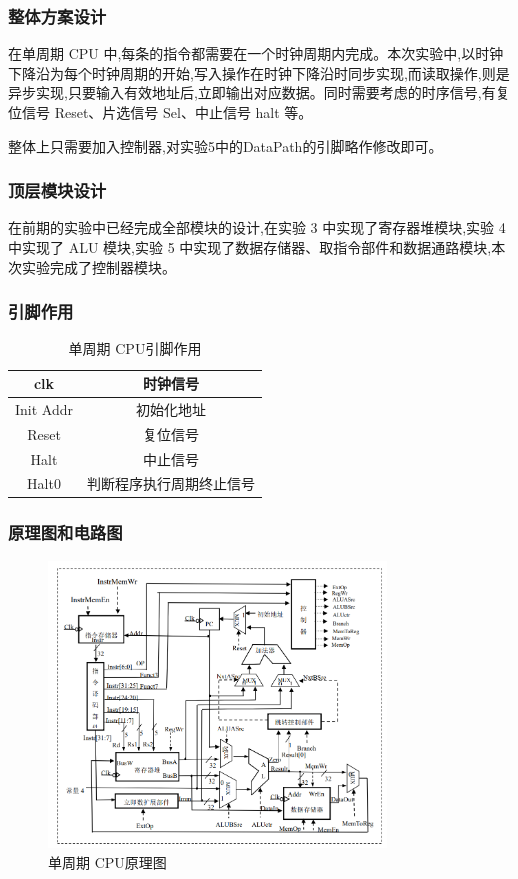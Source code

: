 \documentclass{article}
\begin{document}
    \subsubsection{整体方案设计}
    在单周期 CPU 中,每条的指令都需要在一个时钟周期内完成。本次实验中,以时钟下降沿为每个时钟周期的开始,写入操作在时钟下降沿时同步实现,而读取操作,则是异步实现,只要输入有效地址后,立即输出对应数据。同时需要考虑的时序信号,有复位信号 Reset、片选信号 Sel、中止信号 halt 等。\par
    整体上只需要加入控制器,对实验5中的DataPath的引脚略作修改即可。

    \subsubsection{顶层模块设计}
    在前期的实验中已经完成全部模块的设计,在实验 3 中实现了寄存器堆模块,实验 4 中实现了 ALU 模块,实验 5 中实现了数据存储器、取指令部件和数据通路模块,本次实验完成了控制器模块。

    \subsubsection{引脚作用}
    \begin{table}[H]
    \centering
    \begin{tabular}{|c|c|}
        \hline
        clk   & 时钟信号 \\ \hline
        Init Addr & 初始化地址 \\ \hline
        Reset & 复位信号 \\ \hline
        Halt & 中止信号 \\ \hline
        Halt0 & 判断程序执行周期终止信号 \\ \hline
    \end{tabular}
    \caption{单周期 CPU引脚作用}
    \end{table}

    \subsubsection{原理图和电路图}
    \begin{figure}[H]
        \centering
        \includegraphics[width=0.8\textwidth]{2.4.1.png}
        \caption{单周期 CPU原理图}
        \end{figure}
\end{document}
